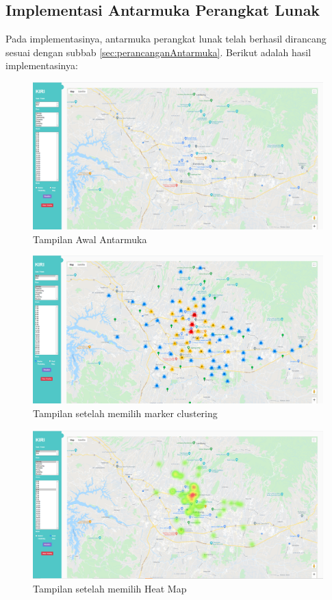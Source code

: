 \subsection{Implementasi Antarmuka Perangkat Lunak}
Pada implementasinya, antarmuka perangkat lunak telah berhasil dirancang sesuai dengan subbab \ref{sec:perancanganAntarmuka}. Berikut adalah hasil implementasinya:

\begin{figure}[H]
	\centering  
	\includegraphics[scale=0.3]{Gambar/Kiri_Ui.PNG}  
	\caption[Tampilan Awal Antarmuka]{Tampilan Awal Antarmuka} 
	\label{fig:interface1} 
\end{figure}

\begin{figure}[H]
	\centering  
	\includegraphics[scale=0.3]{Gambar/Kiri_Ui_Marker.PNG}  
	\caption[Tampilan setelah memilih marker clustering ]{Tampilan setelah memilih marker clustering} 
	\label{fig:interface2} 
\end{figure}

\begin{figure}[H]
	\centering  
	\includegraphics[scale=0.3]{Gambar/Kiri_Ui_Heat_Map.PNG}  
	\caption[Tampilan setelah memilih Heat Map]{Tampilan setelah memilih Heat Map} 
	\label{fig:interface3} 
\end{figure}

